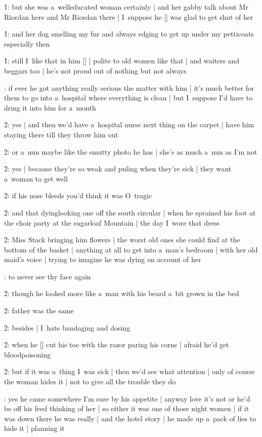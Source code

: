 \f1:
but she was a~welleducated woman certainly |
and her gabby talk about Mr Riordan here and Mr Riordan there |
I~suppose he [\riordan] was glad to get shut of her

\f1:
and her dog smelling my fur
and always edging to get up under my petticoats especially then

\f1:
still I~like that in him [\bloom] |
polite to old women like that |
and waiters and beggars too |
he's not proud out of nothing but not always

:
if ever he got anything really serious the matter with him |
it's much better for them to go into a~hospital where everything is clean |
but I~suppose I'd have to dring it into him for a~month

\f2:
yes |
and then we'd have a~hospital nurse next thing on the carpet |
have him staying there till they throw him out

\f2:
or a~nun maybe like the smutty photo he has |
she's as much a~nun as I'm not

\f2:
yes |
because they're so weak and puling when they're sick |
they want a~woman to get well

\f2:
if his nose bleeds you'd think it was O~tragic

\f2:
and that dyinglooking one off the south circular |
when he sprained his foot at the choir party at the sugarloaf Mountain |
the day I~wore that dress

\f2:
Miss Stack bringing him flowers |
the worst old ones she could find at the bottom of the basket |
anything at all to get into a~man's bedroom |
with her old maid's voice |
trying to imagine he was dying on account of her

:
to never see thy face again

\f2:
though he looked more like a~man with his beard
a~bit grown in the bed

\f2:
father was the same

\f2:
besides |
I~hate bandaging and dosing

\f2:
when he [\bloom] cut his toe with the razor paring his corns |
afraid he'd get blood\-poisoning

\f2:
but if it was a~thing I~was sick |
then we'd see what attention |
only of course the woman hides it |
not to give all the trouble they do

:
yes he came somewhere I'm sure by his appetite |
anyway love it's not or he'd be off his feed thinking of her |
so either it was one of those night women |
if it was down there he was really |
and the hotel story |
he made up a~pack of lies to hide it |
planning it

